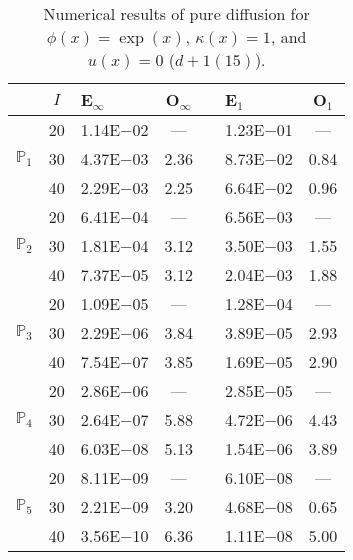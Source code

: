 \begin{table}[H]
\centering
\caption{Numerical results of pure diffusion for $\phi(x)=\exp(x)$, $\kappa(x)=1$, and $u(x)=0$ ($d+1 (15)$).}
\begin{tabular}{@{}l c l c c l c@{}}
\toprule
 & $I$ & E$_{\infty}$ & O$_{\infty}$ && E$_1$ & O$_1$\\
\midrule
\multirow{3}{*}{$\mathbb{P}_{1}$}
 & 20 & 1.14E$-$02 & --- && 1.23E$-$01 & ---\\
 & 30 & 4.37E$-$03 & 2.36 && 8.73E$-$02 & 0.84\\
 & 40 & 2.29E$-$03 & 2.25 && 6.64E$-$02 & 0.96\\
\midrule
\multirow{3}{*}{$\mathbb{P}_{2}$}
 & 20 & 6.41E$-$04 & --- && 6.56E$-$03 & ---\\
 & 30 & 1.81E$-$04 & 3.12 && 3.50E$-$03 & 1.55\\
 & 40 & 7.37E$-$05 & 3.12 && 2.04E$-$03 & 1.88\\
\midrule
\multirow{3}{*}{$\mathbb{P}_{3}$}
 & 20 & 1.09E$-$05 & --- && 1.28E$-$04 & ---\\
 & 30 & 2.29E$-$06 & 3.84 && 3.89E$-$05 & 2.93\\
 & 40 & 7.54E$-$07 & 3.85 && 1.69E$-$05 & 2.90\\
\midrule
\multirow{3}{*}{$\mathbb{P}_{4}$}
 & 20 & 2.86E$-$06 & --- && 2.85E$-$05 & ---\\
 & 30 & 2.64E$-$07 & 5.88 && 4.72E$-$06 & 4.43\\
 & 40 & 6.03E$-$08 & 5.13 && 1.54E$-$06 & 3.89\\
\midrule
\multirow{3}{*}{$\mathbb{P}_{5}$}
 & 20 & 8.11E$-$09 & --- && 6.10E$-$08 & ---\\
 & 30 & 2.21E$-$09 & 3.20 && 4.68E$-$08 & 0.65\\
 & 40 & 3.56E$-$10 & 6.36 && 1.11E$-$08 & 5.00\\
\bottomrule
\end{tabular}
\end{table}
